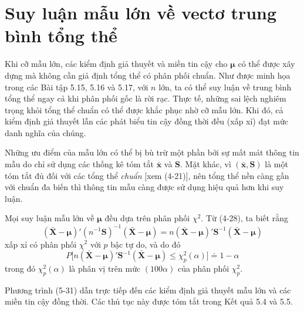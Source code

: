 
\section{Suy luận mẫu lớn về vectơ trung bình tổng thể}
\label{sec:ch05-05}
\renewcommand{\tablename}{Bảng}

Khi cỡ mẫu lớn, các kiểm định giả thuyết và miền tin cậy cho $\boldsymbol{\mu}$ có thể được xây dựng mà không cần giả định tổng thể có phân phối chuẩn. Như được minh họa trong các Bài tập 5.15, 5.16 và 5.17, với $n$ lớn, ta có thể suy luận về trung bình tổng thể ngay cả khi phân phối gốc là rời rạc. Thực tế, những sai lệch nghiêm trọng khỏi tổng thể chuẩn có thể được khắc phục nhờ cỡ mẫu lớn. Khi đó, cả kiểm định giả thuyết lẫn các phát biểu tin cậy đồng thời đều (xấp xỉ) đạt mức danh nghĩa của chúng.

Những ưu điểm của mẫu lớn có thể bị bù trừ một phần bởi sự mất mát thông tin mẫu do chỉ sử dụng các thống kê tóm tắt $\bar{\mathbf{x}}$ và $\mathbf{S}$. Mặt khác, vì $(\bar{\mathbf{x}}, \mathbf{S})$ là một tóm tắt đủ đối với các tổng thể \emph{chuẩn} [xem (4-21)], nên tổng thể nền càng gần với chuẩn đa biến thì thông tin mẫu càng được sử dụng hiệu quả hơn khi suy luận.

Mọi suy luận mẫu lớn về $\boldsymbol{\mu}$ đều dựa trên phân phối $\chi^2$. Từ (4-28), ta biết rằng
\[
    (\bar{\mathbf{X}}-\boldsymbol{\mu})'(n^{-1}\mathbf{S})^{-1}(\bar{\mathbf{X}}-\boldsymbol{\mu}) = n(\bar{\mathbf{X}}-\boldsymbol{\mu})'\mathbf{S}^{-1}(\bar{\mathbf{X}}-\boldsymbol{\mu})
\]
xấp xỉ có phân phối $\chi^2$ với $p$ bậc tự do, và do đó
\setcounter{equation}{30}
\begin{equation}\label{eq:5-31}
    P\bigl[n(\bar{\mathbf{X}}-\boldsymbol{\mu})'\mathbf{S}^{-1}(\bar{\mathbf{X}}-\boldsymbol{\mu}) \le \chi_p^2(\alpha)\bigr] \doteq 1-\alpha
\end{equation}
trong đó $\chi_p^2(\alpha)$ là phân vị trên mức $(100\alpha)$ của phân phối $\chi_p^2$.

Phương trình (5-31) dẫn trực tiếp đến các kiểm định giả thuyết mẫu lớn và các miền tin cậy đồng thời. Các thủ tục này được tóm tắt trong Kết quả 5.4 và 5.5.

